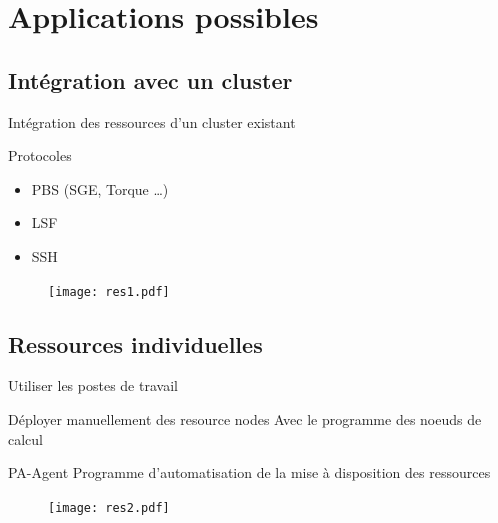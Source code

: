 \documentclass{beamer}
\begin{document}
\section[Applications]{Applications possibles}
\begin{frame}
	\tableofcontents[currentsection]
\end{frame}
\subsection{Intégration avec un cluster}
\begin{frame}{Intégration des ressources d'un cluster existant}
    \begin{block}{Protocoles}
    \begin{itemize}
        \item PBS (SGE, Torque \ldots)
        \item LSF
        \item SSH  
    \end{itemize}
        
    \end{block}
        \begin{figure}
            \centering
            \texttt{[image: res1.pdf]}
        \end{figure}
\end{frame}
\subsection{Ressources individuelles}
\begin{frame}{Utiliser les postes de travail}
    \begin{block}{Déployer manuellement des resource nodes}
    Avec le programme des noeuds de calcul
        
    \end{block}
    \begin{block}{PA-Agent}
    Programme d'automatisation de la mise à disposition des ressources
        
    \end{block}
    \vspace{0.2cm}
        \begin{figure}
            \centering
            \texttt{[image: res2.pdf]}
        \end{figure}
\end{frame}
\end{document}
